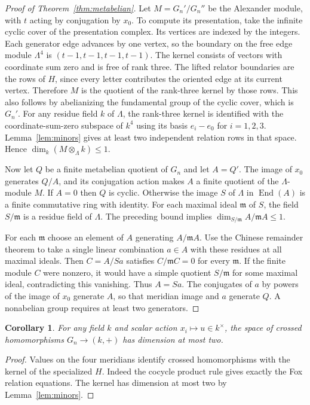 \documentclass[11pt]{article}
\newtheorem{corollary}[theorem]{Corollary}
\begin{document}
\begin{proof}[Proof of Theorem~\ref{thm:metabelian}]
Let $M=G_n'/G_n''$ be the Alexander module, with $t$ acting by
conjugation by $x_0$. To compute its presentation, take the infinite
cyclic cover of the presentation complex. Its vertices are indexed
by the integers. Each generator edge advances by one vertex, so the
boundary on the free edge module $\Lambda^4$ is
$(t-1,t-1,t-1,t-1)$. The kernel consists of vectors with coordinate
sum zero and is free of rank three. The lifted relator boundaries
are the rows of $H$, since every letter contributes the oriented edge
at its current vertex. Therefore $M$ is the quotient of the
rank-three kernel by those rows. This also follows by abelianizing
the fundamental group of the cyclic cover, which is $G_n'$.
For any residue field $k$ of $\Lambda$, the rank-three kernel is
identified with the coordinate-sum-zero subspace of $k^4$ using its
basis $e_i-e_0$ for $i=1,2,3$. Lemma~\ref{lem:minors} gives at least
two independent relation rows in that space. Hence
$\dim_k(M\otimes_\Lambda k)\le1$.

Now let $Q$ be a finite metabelian quotient of $G_n$ and let $A=Q'$.
The image of $x_0$ generates $Q/A$, and its conjugation action makes
$A$ a finite quotient of the $\Lambda$-module $M$. If $A=0$ then
$Q$ is cyclic. Otherwise the image $S$ of $\Lambda$ in
$\operatorname{End}(A)$ is a finite commutative ring with identity.
For each maximal ideal $\mathfrak m$ of $S$, the field
$S/\mathfrak m$ is a residue field of $\Lambda$. The preceding bound
implies $\dim_{S/\mathfrak m} A/\mathfrak m A\le1$.

For each $\mathfrak m$ choose an element of $A$ generating
$A/\mathfrak m A$. Use the Chinese remainder theorem to take a single
linear combination $a\in A$ with these residues at all maximal ideals.
Then $C=A/Sa$ satisfies $C/\mathfrak m C=0$ for every $\mathfrak m$.
If the finite module $C$ were nonzero, it would have a simple
quotient $S/\mathfrak m$ for some maximal ideal, contradicting this
vanishing. Thus $A=Sa$. The conjugates of $a$ by powers of the image
of $x_0$ generate $A$, so that meridian image and $a$ generate $Q$.
A nonabelian group requires at least two generators.
\end{proof}

\begin{corollary}\label{cor:scalar}
For any field $k$ and scalar action $x_i\mapsto u\in k^\times$,
the space of crossed homomorphisms $G_n\to(k,+)$ has dimension at most two.
\end{corollary}
\begin{proof}
Values on the four meridians identify crossed homomorphisms
with the kernel of the specialized $H$. Indeed the cocycle product
rule gives exactly the Fox relation equations. The kernel has
dimension at most two by Lemma~\ref{lem:minors}.
\end{proof}
\end{document}
